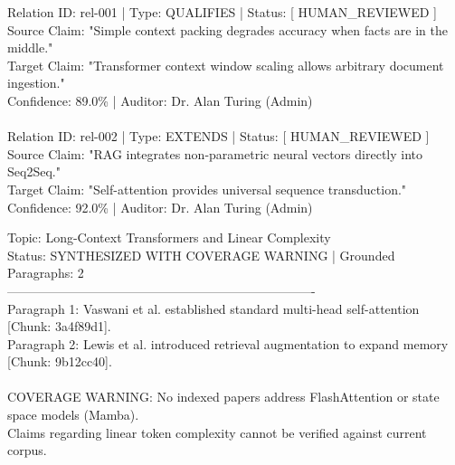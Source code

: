 \documentclass[11pt,a4paper,titlepage]{report}
\begin{document}
\begin{tcolorbox}[colback=white, colframe=primaryTeal, width=\textwidth, arc=3pt, title={Claim Relations and Audit State}]
\footnotesize\ttfamily
Relation ID: rel-001 | Type: QUALIFIES | Status: [ HUMAN_REVIEWED ]\\
Source Claim: "Simple context packing degrades accuracy when facts are in the middle."\\
Target Claim: "Transformer context window scaling allows arbitrary document ingestion."\\
Confidence: 89.0\% | Auditor: Dr. Alan Turing (Admin)\\
\\
Relation ID: rel-002 | Type: EXTENDS    | Status: [ HUMAN_REVIEWED ]\\
Source Claim: "RAG integrates non-parametric neural vectors directly into Seq2Seq."\\
Target Claim: "Self-attention provides universal sequence transduction."\\
Confidence: 92.0\% | Auditor: Dr. Alan Turing (Admin)
\end{tcolorbox}
\vspace{-2pt}
\label{fig:claim_badges}
\vspace{6pt}

\begin{tcolorbox}[colback=white, colframe=primaryTeal, width=\textwidth, arc=3pt, title={Literature Review Studio: Generated Review with Coverage Warning}]
\footnotesize\ttfamily
Topic: Long-Context Transformers and Linear Complexity\\
Status: SYNTHESIZED WITH COVERAGE WARNING | Grounded Paragraphs: 2\\
-------------------------------------------------------------------------\\
Paragraph 1: Vaswani et al. established standard multi-head self-attention [Chunk: 3a4f89d1].\\
Paragraph 2: Lewis et al. introduced retrieval augmentation to expand memory [Chunk: 9b12cc40].\\
\\
[!] COVERAGE WARNING: No indexed papers address FlashAttention or state space models (Mamba).\\
    Claims regarding linear token complexity cannot be verified against current corpus.
\end{tcolorbox}
\vspace{-2pt}
\label{fig:coverage_warning}
\vspace{6pt}
\end{document}
